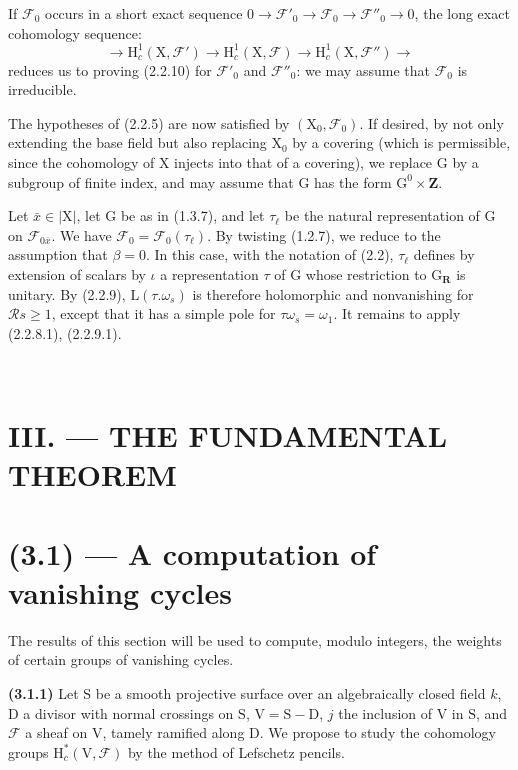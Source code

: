 \documentclass[11pt,leqno]{article}
\newcommand{\Page}[1]{\ifvmode\noindent\else\unskip\ \fi{\footnotesize\textcolor{gray}{[p.\,#1]}}\ \ignorespaces}
\begin{document}
If \(\mathscr F_0\) occurs in a short exact sequence \(0\to\mathscr F'_0\to\mathscr F_0\to\mathscr F''_0\to0\), the long exact cohomology sequence:
\[
\to\mathrm H_c^1(\mathrm X,\mathscr F')
\to\mathrm H_c^1(\mathrm X,\mathscr F)
\to\mathrm H_c^1(\mathrm X,\mathscr F'')\to
\]
reduces us to proving (2.2.10) for \(\mathscr F'_0\) and \(\mathscr F''_0\): we may assume that \(\mathscr F_0\) is irreducible.

The hypotheses of (2.2.5) are now satisfied by \((\mathrm X_0,\mathscr F_0)\). If desired, by not only extending the base field but also replacing \(\mathrm X_0\) by a covering (which is permissible, since the cohomology of \(\mathrm X\) injects into that of a covering), we replace \(\mathrm G\) by a subgroup of finite index, and may assume that \(\mathrm G\) has the form \(\mathrm G^0\times\mathbf Z\).

Let \(\bar{x}\in|\mathrm X|\), let \(\mathrm G\) be as in (1.3.7), and let \(\tau_\ell\) be the natural representation of \(\mathrm G\) on \(\mathscr F_{0\bar{x}}\). We have \(\mathscr F_0=\mathscr F_0(\tau_\ell)\). By twisting (1.2.7), we reduce to the assumption that \(\beta=0\). In this case, with the notation of (2.2), \(\tau_\ell\) defines by extension of scalars by \(\iota\) a representation \(\tau\) of \(\mathrm G\) whose restriction to \(\mathrm G_{\mathbf R}\) is unitary. By (2.2.9), \(\mathrm L(\tau.\omega_s)\) is therefore holomorphic and nonvanishing for \(\mathscr R s\geq1\), except that it has a simple pole for \(\tau\omega_s=\omega_1\). It remains to apply (2.2.8.1), (2.2.9.1).

\Page{197}

\section*{III. — THE FUNDAMENTAL THEOREM}

\section*{(3.1) — A computation of vanishing cycles}

The results of this section will be used to compute, modulo integers, the weights of certain groups of vanishing cycles.

\textbf{(3.1.1)} Let \(\mathrm S\) be a smooth projective surface over an algebraically closed field \(k\), \(\mathrm D\) a divisor with normal crossings on \(\mathrm S\), \(\mathrm V=\mathrm S-\mathrm D\), \(j\) the inclusion of \(\mathrm V\) in \(\mathrm S\), and \(\mathscr F\) a sheaf on \(\mathrm V\), tamely ramified along \(\mathrm D\). We propose to study the cohomology groups \(\mathrm H_c^*(\mathrm V,\mathscr F)\) by the method of Lefschetz pencils.
\end{document}
